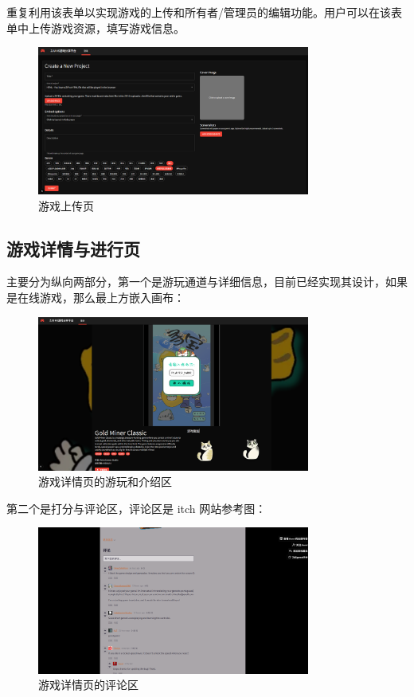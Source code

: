\documentclass[12pt]{ctexart} %
\begin{document}
重复利用该表单以实现游戏的上传和所有者/管理员的编辑功能。用户可以在该表单中上传游戏资源，填写游戏信息。

\begin{figure}[H]
  \centering
  \includegraphics[width=0.8\textwidth]{UI-upload.png}
  \caption{游戏上传页}
\end{figure}


\subsection{游戏详情与进行页}

主要分为纵向两部分，第一个是游玩通道与详细信息，目前已经实现其设计，如果是在线游戏，那么最上方嵌入画布：

\begin{figure}[H]
  \centering
  \includegraphics[width=0.8\textwidth]{UI-detailed.png}
  \caption{游戏详情页的游玩和介绍区}
\end{figure}


第二个是打分与评论区，评论区是 itch 网站参考图：


\begin{figure}[H]
  \centering
  \includegraphics[width=0.8\textwidth]{UI-comment.png}
  \caption{游戏详情页的评论区}
\end{figure}
\end{document}
